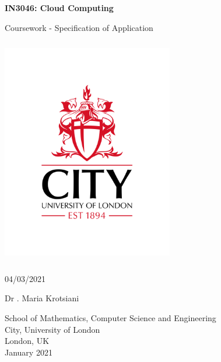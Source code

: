\documentclass[11pt]{article}
\begin{document}
\begin{titlepage}
    \centering
    {\LARGE\bfseries IN3046: Cloud Computing }

    \vspace{0.5cm}

    {\Large Coursework - Specification of Application}

    \includegraphics[width=7.5cm, height=10cm]{Images/CUL Logo}

    \vspace{0.1cm}

    {\Large 04/03/2021}
    \vspace{0.5cm}

    {\large Dr . Maria Krotsiani}
    \vspace {0.5cm}

    \vspace*{\fill}

    {School of Mathematics, Computer Science and Engineering \\ City, University of London \\ London, UK \\ January 2021}
\end{titlepage}
\end{document}
